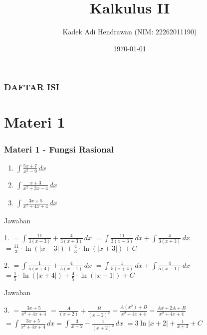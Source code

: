 \documentclass{beamer}
\title{Kalkulus II}
\author{Kadek Adi Hendrawan (NIM: 22262011190)}
\institute{Sekolah Tinggi Teknologi Bandung}
\date{\today}
\begin{document}
\begin{frame}
  \titlepage
\end{frame}

\begin{frame}
  \frametitle{\textbf{DAFTAR ISI}}
  \tableofcontents
\end{frame}

\section{Materi 1}

\begin{frame}
  \frametitle{Materi 1 - Fungsi Rasional}

  \begin{enumerate}
    \item $\displaystyle \int \frac{{5x + 7}}{{x^2 - 9}} \, dx$
    \item $\displaystyle \int \frac{x + 3}{x^2 + 3x - 4} \, dx$
    \item $\displaystyle \int \frac{3x + 5}{x^2 + 4x + 4} \, dx$
  \end{enumerate}

\end{frame}
\begin{frame}{Jawaban}
        \begin{enumerate}
1. $\displaystyle =\int \frac{11}{3\left(x-3\right)}+ \frac{4}{3\left(x+3\right)} \,dx$
    $\displaystyle=\int \frac{11}{3\left(x-3\right)} \, dx+ \int \frac{4}{3\left(x+3\right)} \,dx$
    $\displaystyle=\frac{11}{3}\cdot \ln \left(\left|x-3\right|\right)+ \frac{4}{3} \cdot \ln \left(\left|x+3\right|\right)+C$
\end{enumerate}
\begin{enumerate}
2. $\displaystyle =\int \frac{1}{5\left(x+4\right)}+\frac{4}{5\left(x-1\right)} \, dx$
    $\displaystyle  =\int \frac{1}{5\left(x+4\right)} \, dx + \int\frac{4}{5\left(x-1\right)} \, dx$
    $\displaystyle = \frac{1}{5} \cdot \ln \left(\left|x+4\right|\right)+ \frac{4}{5} \cdot \ln \left(\left|x-1\right|\right)+C$
\end{enumerate}
\end{frame}
\begin{frame}{Jawaban}
    \begin{enumerate}
3. $\displaystyle = \frac{3x+5}{x^2+4x+4}$
    $\displaystyle = \frac{A}{\left(x+2\right)}+\frac{B}{\left(x+2\right)^2} = \frac{A\left(x^2\right)+B}{x^2+4x+4} = \frac{Ax+2A+B}{x^2+4x+4}$
    $\displaystyle = \int \frac{3x+5}{x^3+4x+4}\, dx = \int \frac{3}{x+2}-\frac{1}{\left(x+2\right)^2}\, dx$ 
    $\displaystyle = 3 \ln \left|x+2\right|+\frac{1}{x+2}+C$
    \end{enumerate}
\end{frame}
\end{document}
